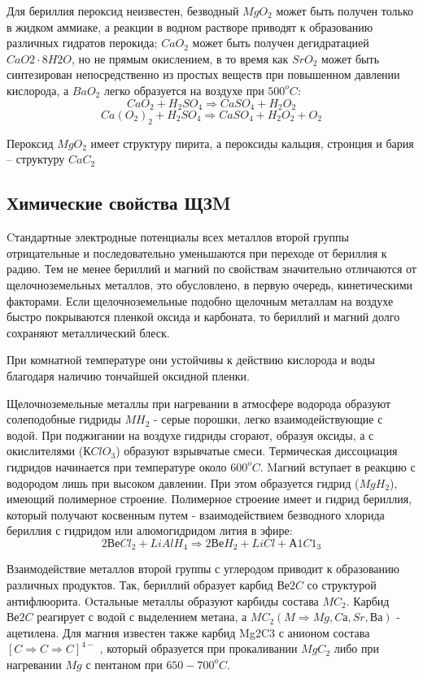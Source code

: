 \documentclass[11pt]{article}
\begin{document}
Для бериллия пероксид неизвестен,
безводный $MgO_2$ может быть получен только в жидком аммиаке, а реакции в водном
растворе приводят к образованию различных гидратов перокида; $CaO_2$ может быть
получен дегидратацией $CaO2\cdot 8H2O$, но не прямым окислением, в то время как $SrO_2$ может
быть синтезирован непосредственно из простых веществ при повышенном давлении
кислорода, а $BaO_2$ легко образуется на воздухе при $500^oC$:
$$CaO_2 + H_2SO_4 \Rightarrow CaSO_4 + H_2O_2$$
$$Ca(O_2)_2 + H_2SO_4 \Rightarrow CaSO_4 + H_2O_2 + O_2$$

Пероксид $MgO_2$ имеет структуру пирита, а пероксиды кальция, стронция и бария –
структуру $CaC_2$

\subsection{Химические свойства ЩЗM}

Cтандартные электродные потенциалы всех металлов второй группы
отрицательные и последовательно уменьшаются при переходе от бериллия к радию. Тем
не менее бериллий и магний по свойствам значительно отличаются от щелочноземельных
металлов, это обусловлено, в первую очередь, кинетическими факторами. Если
щелочноземельные подобно щелочным металлам на воздухе быстро покрываются
пленкой оксида и карбоната, то бериллий и магний долго сохраняют металлический блеск.

При комнатной температуре они устойчивы к действию кислорода и воды благодаря
наличию тончайшей оксидной пленки.

Щелочноземельные металлы при нагревании в атмосфере водорода образуют
солеподобные гидриды $MH_2$ - серые порошки, легко взаимодействующие с водой. При
поджигании на воздухе гидриды сгорают, образуя оксиды, а с окислителями ($КClO_3$)
образуют взрывчатые смеси. Термическая диссоциация гидридов начинается при
температуре около $600 ^oC$. Mагний вступает в реакцию с водородом лишь при высоком
давлении. При этом образуется гидрид ($MgH_2$), имеющий полимерное строение.
Полимерное строение имеет и гидрид бериллия, который получают косвенным путем -
взаимодействием безводного хлорида бериллия с гидридом или алюмогидридом лития в
эфире:
$$2ВеCl_2 + LiAlH_4 \Rightarrow 2ВеH_2 + LiCl + А1C1_3$$

Взаимодействие металлов второй группы с углеродом приводит к образованию
различных продуктов. Так, бериллий образует карбид $Ве2C$ со структурой антифлюорита.
Oстальные металлы образуют карбиды состава $MC_2$. Карбид $Ве2C$ реагирует с водой с
выделением метана, а $MC_2 (M \Rightarrow Mg, Cа, Sr, Ва)$ - ацетилена. Для магния известен также
карбид Mg2C3 с анионом состава $[C \Rightarrow C \Rightarrow C ]^{4-}$
, который образуется при прокаливании $MgC_2$ либо при нагревании $Mg$ с пентаном при $650 - 700^oC$.
\end{document}
